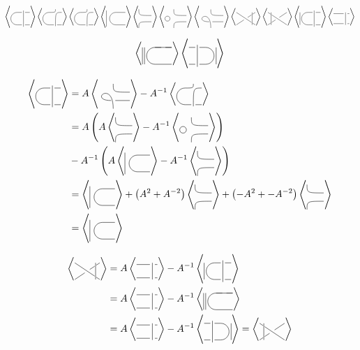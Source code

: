 \documentclass[10pt]{article}
\begin{document}
\begin{equation}
\left< \reiddva \right>
\left< \AO \right>
\left< \BO \right>
\left< \CO \right>
\left< \DO \right>
\left< \EO \right>
\left< \FO \right>
\left< \GO \right>
\left< \HO \right>
\left< \IO \right>
\left< \JO \right>
\end{equation}

\begin{equation}
\left< \KO \right>
\left< \LO \right>
\end{equation}

\begin{equation*}
\begin{split}
\left< \reiddva \right> & = A \left< \FO \right> - A^{-1} \left< \BO \right> \\ & = A \left( A \left< \DO \right> - A^{-1} \left< \EO \right> \right) \\ & - A^{-1} \left( A \left< \CO \right> - A^{-1} \left< \DO \right> \right) \\ & = \left< \CO \right> + \left( A^2 + A^{-2} \right) \left< \DO \right> + \left( -A^2 + -A^{-2} \right) \left< \DO \right>  \\ & = \left< \CO \right>
\end{split}
\end{equation*}

\begin{equation*}
\begin{split}
\left< \GO \right> & = A \left< \JO \right> - A^{-1} \left< \IO \right> \\ & = A \left< \JO \right> - A^{-1} \left< \KO \right>  \\ & = A \left< \JO \right> - A^{-1} \left< \LO \right> = \left< \HO \right>
\end{split}
\end{equation*}
\end{document}
